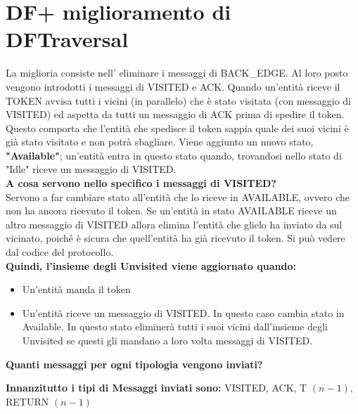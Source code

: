 \section{DF+ miglioramento di DFTraversal}
La miglioria consiste nell' eliminare i messaggi di BACK\_EDGE. Al loro posto
vengono introdotti i messaggi di VISITED e ACK. Quando un'entità riceve il TOKEN
avvisa tutti i vicini (in parallelo) che è stato visitata (con messaggio di
VISITED) ed aspetta da tutti un messaggio di ACK prima di spedire il token.
Questo comporta che l'entità che spedisce il token sappia quale dei suoi vicini
è già stato visitato e non potrà sbagliare. Viene aggiunto un nuovo stato,
\textbf{"Available"}; un'entità entra in questo stato quando, trovandosi nello
stato di "Idle" riceve un messaggio di VISITED.\\

\textbf{A cosa servono nello specifico i messaggi di VISITED?}\\
Servono a far cambiare stato all'entità che lo riceve in AVAILABLE, ovvero che
non ha ancora ricevuto il token. Se un'entità in stato AVAILABLE riceve un altro
messaggio di VISITED allora elimina l'entità che glielo ha inviato da sul
vicinato, poiché è sicura che quell'entità ha già ricevuto il token. Si può
vedere dal codice del protocollo.\\
\textbf{Quindi, l'insieme degli Unvisited viene aggiornato quando:}
\begin{itemize}
    \item Un'entità manda il token
    \item Un'entità riceve un messaggio di VISITED. In questo caso cambia stato in
          Available. In questo stato eliminerà tutti i suoi vicini dall'insieme degli
          Unvisited se questi gli mandano a loro volta messaggi di VISITED.
\end{itemize}

\textbf{Quanti messaggi per ogni tipologia vengono inviati?}

\textbf{Innanzitutto i tipi di Messaggi inviati sono:} VISITED, ACK, T $(n-1)$,
RETURN $(n-1)$


